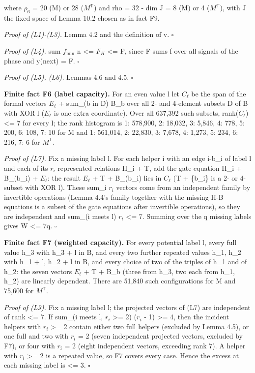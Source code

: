 where \(\rho_6\) = 20 (M) or 28 (\(M^{\mathsf T}\)) and rho = 32 - dim J = 8 (M) or 4 (\(M^{\mathsf T}\)), with J the fixed space of Lemma 10.2 chosen as in fact F9.

\emph{Proof of (L1)-(L3).} Lemma 4.2 and the definition of v. \(\square\)

\emph{Proof of (L4).} sum \(f_{\min}\) n \textless= \(F_H\) \textless= F, since F sums f over all signals of the phase and y(next) = F. \(\square\)

\emph{Proof of (L5), (L6).} Lemmas 4.6 and 4.5. \(\square\)

\textbf{Finite fact F6 (label capacity).} For an even value l let \(C_\ell\) be the span of the formal vectors \(E_\ell\) + sum\_(b in D) B\_b over all 2- and 4-element subsets D of B with XOR l (\(E_\ell\) is one extra coordinate). Over all 637,392 such subsets, rank(\(C_\ell\)) \textless= 7 for every l; the rank histogram is 1: 578,900, 2: 18,032, 3: 5,846, 4: 778, 5: 200, 6: 108, 7: 10 for M and 1: 561,014, 2: 22,830, 3: 7,678, 4: 1,273, 5: 234, 6: 216, 7: 6 for \(M^{\mathsf T}\).

\emph{Proof of (L7).} Fix a missing label l. For each helper i with an edge i-b\_i of label l and each of its \(r_i\) represented relations H\_i + T, add the gate equation H\_i + B\_(b\_i) + \(E_\ell\): the result \(E_\ell\) + T + B\_(b\_i) lies in \(C_\ell\) (T + \{b\_i\} is a 2- or 4-subset with XOR l). These sum\_i \(r_i\) vectors come from an independent family by invertible operations (Lemma 4.4's family together with the missing H-B equations is a subset of the gate equations after invertible operations), so they are independent and sum\_(i meets l) \(r_i\) \textless= 7. Summing over the q missing labels gives W \textless= 7q. \(\square\)

\textbf{Finite fact F7 (weighted capacity).} For every potential label l, every full value h\_3 with h\_3 + l in B, and every two further repeated values h\_1, h\_2 with h\_1 + l, h\_2 + l in B, and every choice of two of the triples of h\_1 and of h\_2: the seven vectors \(E_\ell\) + T + B\_b (three from h\_3, two each from h\_1, h\_2) are linearly dependent. There are 51,840 such configurations for M and 75,600 for \(M^{\mathsf T}\).

\emph{Proof of (L9).} Fix a missing label l; the projected vectors of (L7) are independent of rank \textless= 7. If sum\_(i meets l, \(r_i\) \textgreater= 2) (\(r_i\) - 1) \textgreater= 4, then the incident helpers with \(r_i\) \textgreater= 2 contain either two full helpers (excluded by Lemma 4.5), or one full and two with \(r_i\) = 2 (seven independent projected vectors, excluded by F7), or four with \(r_i\) = 2 (eight independent vectors, exceeding rank 7). A helper with \(r_i\) \textgreater= 2 is a repeated value, so F7 covers every case. Hence the excess at each missing label is \textless= 3. \(\square\)


